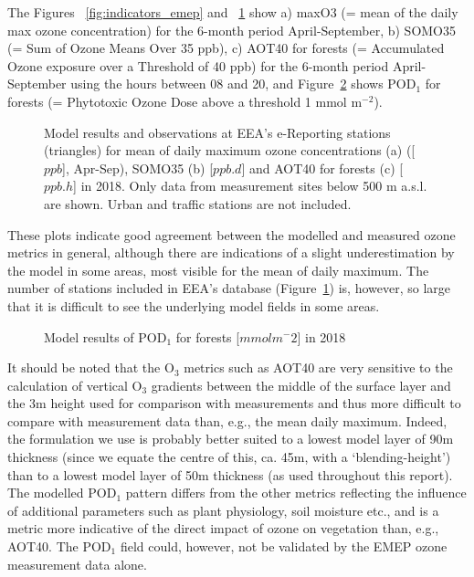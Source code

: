 The Figures ~\ref{fig:indicators_emep} and ~\ref{fig:indicators_airbase} show a) maxO3 (= mean of the daily max ozone concentration) for the 6-month period April-September, b) SOMO35 (= Sum of Ozone Means Over 35 ppb), c) AOT40 for forests (= Accumulated Ozone exposure over a Threshold of 40 ppb) for the 6-month period April-September using the hours between 08 and 20, and Figure~\ref{fig:indicatorPOD} shows POD$_1$ for forests (= Phytotoxic Ozone Dose above a threshold 1 mmol m$^{-2}$). 

\begin{figure}[H]
  \centering
\caption{Model results and observations at EEA's e-Reporting stations (triangles) for mean of daily maximum ozone concentrations (a) ([$ppb$], Apr-Sep), SOMO35 (b) [$ppb.d$] and AOT40 for forests (c) [$ppb.h$] in 2018. Only data from measurement sites below 500 m a.s.l. are shown. Urban and traffic stations are not included.}
\label{fig:indicators_airbase}
\end{figure}

These plots indicate good agreement between the modelled and measured ozone metrics in general, although there are indications of a slight underestimation by the model in some areas, most visible for the mean of daily maximum. The number of stations included in EEA's database (Figure~\ref{fig:indicators_airbase}) is, however, so large that it is difficult to see the underlying model fields in some areas.

\begin{figure}[H]
\caption{Model results of POD$_1$ for forests [$mmol m^-2$] in 2018}
\label{fig:indicatorPOD}
\end{figure}

It should be noted that the O$_3$ metrics such as AOT40 are very sensitive to the calculation of vertical O$_3$ gradients between the middle of the surface layer and the 3m height used for comparison with measurements \citep{Tuovinen:EP2007} and thus more difficult to compare with measurement data than, e.g., the mean daily maximum. Indeed, the formulation we use \citep{Simpson:EMEP2012} is probably better suited to a lowest model layer of 90m thickness (since we equate the centre of this, ca. 45m, with a `blending-height') than to a lowest model layer of 50m thickness (as used throughout this report). 
The modelled POD$_1$ pattern differs from the other metrics reflecting the influence of additional parameters such as plant physiology, soil moisture etc., and is a metric more indicative of the direct impact of ozone on vegetation than, e.g., AOT40. The POD$_1$ field could, however, not be validated by the EMEP ozone measurement data alone. 

